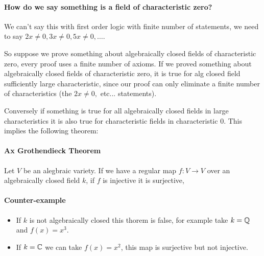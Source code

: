 \paragraph*{How do we say something is a field of characteristic zero?}
We can't say this with first order logic with finite number of statements, we need to say $2x\neq 0, 3x\neq 0, 5x\neq 0, \ldots$.

So suppose we prove something about algebraically closed fields of characteristic zero, every proof uses a finite number of axioms. If we proved something about algebraically closed fields of characteristic zero, it is true for alg closed field sufficiently large characteristic, since our proof can only eliminate a finite number of characteristics (the $2x\neq 0,$ etc... statements).

Conversely if something is true for all algebraically closed fields in large characteristics it is also true for characteristic fields in characteristic $0$. This implies the following theorem: 

\paragraph*{Ax Grothendieck Theorem}\begin{theorem}
    Let $V$ be an alegbraic variety. If we have a regular map $f\colon V\rightarrow V$ over an algebraically closed field $k$, if $f$ is injective it is surjective,
\end{theorem}
\paragraph*{Counter-example}\begin{itemize}
    \item If $k$ is not algebraically closed this thorem is false, for example take $k=\mathbb{Q}$ and $f(x) = x^3$.
    \item If $k=\mathbb{C}$ we can take $f(x) = x^2$, this map is surjective but not injective.
\end{itemize}


